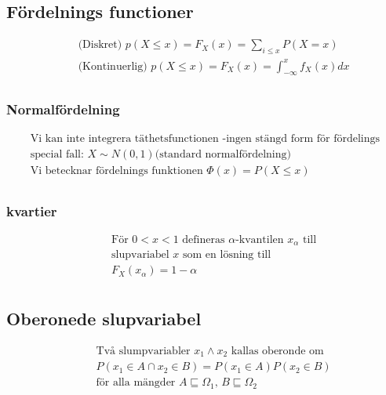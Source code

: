 \subsection{Fördelnings functioner}
\begin{align*}
  &\quad  \text{(Diskret) }      p(X\leq{x}) = F_X(x) = \sum_{i\leq{x}} P(X=x) \\
  &\quad  \text{(Kontinuerlig) } p(X\leq{x}) = F_X(x) =  \int_{-\infty}^{x} f_X(x)dx \\
\end{align*}

\subsubsection{Normalfördelning}
\begin{align*}
  &\quad  \text{Vi kan inte integrera täthetsfunctionen -ingen stängd form för fördelings funktionen} \\
  &\quad  \text{special fall: } X\sim{N(0,1)} \text{(standard normalfördelning)} \\
  &\quad  \text{Vi betecknar fördelnings funktionen } \Phi(x) = P(X\leq{x}) \\
\end{align*}

\subsubsection{kvartier}
\begin{align*}
  &\quad  \text{För $0<x<1$ defineras $\alpha$-kvantilen $x_{\alpha}$ till} \\
  &\quad  \text{slupvariabel $x$ som en lösning till } \\
  &\quad  F_X(x_\alpha) = 1-\alpha \\
\end{align*}

\subsection{Oberonede slupvariabel}
\begin{align*}
  &\quad  \text{Två slumpvariabler $x_1 \land x_2$ kallas oberonde om} \\
  &\quad  P({x_1\in A} \cap  {x_2\in B}) = P(x_1\in A)P(x_2\in B) \\
  &\quad  \text{för alla mängder $A\sqsubseteq \Omega_1, \, B\sqsubseteq \Omega_2$} \\
\end{align*}

